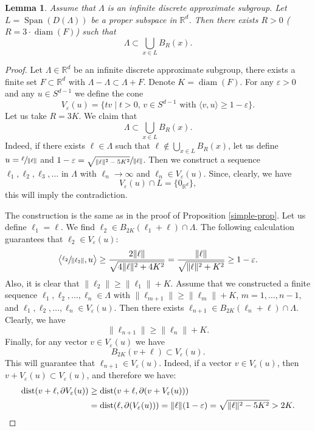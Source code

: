 \documentclass[10pt]{amsart}
\DeclareMathOperator{\diam}{diam}
\DeclareMathOperator{\dist}{dist}
\DeclareMathOperator{\Span}{Span}
\newcommand{\bR}{\mathbb{R}}
\let\eps\varepsilon
\newcounter{dummy} \numberwithin{dummy}{section}
\theoremstyle{plain}
\newtheorem{lemma}[dummy]{Lemma}
\theoremstyle{definition}
\begin{document}
\begin{lemma}\label{lemma}
Assume that $\Lambda$ is an infinite discrete approximate subgroup. Let $L = \Span(D(\Lambda))$ be a proper subspace in $\bR^d$. Then there exists $R > 0$ ($R = 3\cdot \diam(F)$) such that
\[
\Lambda \subset \bigcup_{x \in L} B_R(x).
\]
\end{lemma}
\begin{proof}
Let $\Lambda \in \bR^d$ be an infinite discrete approximate subgroup, \ie there exists a finite set $F \subset \bR^d$ with $\Lambda - \Lambda \subset \Lambda + F$. Denote $K = \diam(F)$.
For any $\eps > 0$ and any $u \in S^{d-1}$ we define the cone
\[
V_{\eps}(u) = \{ t v \mid t > 0,\, v \in S^{d-1} \text{ with } \langle v, u \rangle \ge 1 - \eps \}.
\]
Let us take $R = 3K$. We claim that
\[
\Lambda \subset \bigcup_{x \in L} B_R(x).
\]
Indeed, if there exists $\ell \in \Lambda$ such that $\ell \not \in \bigcup_{x \in L} B_R(x)$, let us define $u = \sfrac{\ell}{\| \ell \|}$ and $1 - \eps = \sfrac{\sqrt{\| \ell \|^2 - 5K^2}}{\| \ell \|}$. Then we construct a sequence $\ell_1, \ell_2,\ell_3,\ldots$ in $\Lambda$ with $\ell_n \to \infty$ and $\ell_n \in V_{\eps}(u)$. Since, clearly, we have
\[
V_{\eps}(u) \cap L = \{ 0_{\bR^d} \},
\]
this will imply the contradiction.

The construction is the same as in the proof of Proposition \ref{simple-prop}. Let us define $\ell_1 = \ell$. We find $\ell_2 \in B_{2K}(\ell_1 + \ell) \cap \Lambda$. The following calculation guarantees that $\ell_2 \in V_{\eps}(u)$:
\[
\bigl\langle \sfrac{\ell_2}{\| \ell_2 \|}, u \bigr\rangle \ge \frac{2 \| \ell \|}{\sqrt{4\| \ell \|^2+ 4 K^2}} = \frac{\| \ell \|}{ \sqrt{\|\ell \|^2 + K^2}} \ge 1 - \eps.
\]
Also, it is clear that $\|\ell_2 \| \ge \| \ell_1 \| +K$. Assume that we constructed a finite sequence $\ell_1,\ell_2, \ldots, \ell_n \in \Lambda$ with $\| \ell_{m+1} \| \ge \| \ell_m \| + K$, $m=1,\ldots,n-1$, and $\ell_1,\ell_2,\ldots,\ell_n \in V_{\eps}(u)$. Then there exists $\ell_{n+1} \in B_{2K}(\ell_n + \ell) \cap \Lambda$. Clearly, we have
\[
\| \ell_{n+1} \| \ge \| \ell_n \| + K.
\]
Finally, for any vector $v \in V_{\eps}(u)$ we have
\[
B_{2K}(v + \ell) \subset V_{\eps}(u).
\]
This will guarantee that $\ell_{n+1} \in V_{\eps}(u)$. Indeed, if a vector $v \in V_{\eps}(u)$, then $v+ V_{\eps}(u) \subset V_{\eps}(u)$, and therefore we have:
\begin{align*}
\dist(v+\ell, \partial V_{\eps}(u)) &\ge \dist(v + \ell, \partial(v + V_{\eps}(u)))\\
& = \dist(\ell, \partial(V_{\eps}(u))) = \| \ell \| (1-\eps)
= \sqrt{\| \ell \|^2 - 5K^2} > 2K. \qedhere
\end{align*}
\end{proof}
\end{document}
